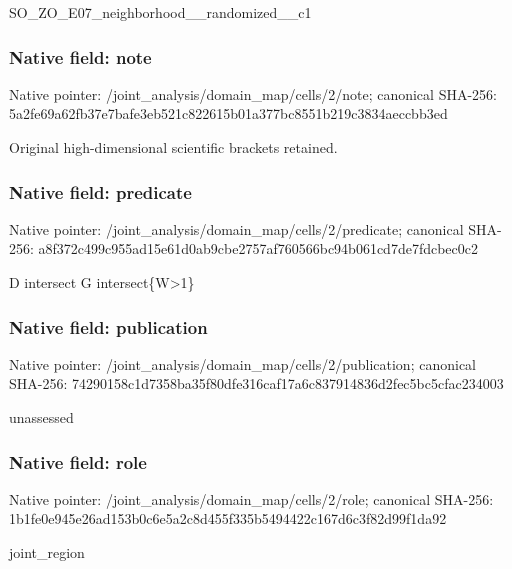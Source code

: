 \documentclass[10pt,a4paper]{article}
\begin{document}
\begingroup\raggedright\sloppy SO\_\allowbreak{}ZO\_\allowbreak{}E07\_\allowbreak{}neighborhood\_\allowbreak{}\_\allowbreak{}randomized\_\allowbreak{}\_\allowbreak{}c1\par\endgroup

\subsubsection{Native field: note}
Native pointer: /joint\_\allowbreak{}analysis/domain\_\allowbreak{}map/cells/2/note; canonical SHA-256: 5a2fe69a62fb37e7bafe3eb521c822615b01a377bc8551b219c3834aeccbb3ed

\begingroup\raggedright\sloppy Original high-dimensional scientific brackets retained.\par\endgroup

\subsubsection{Native field: predicate}
Native pointer: /joint\_\allowbreak{}analysis/domain\_\allowbreak{}map/cells/2/predicate; canonical SHA-256: a8f372c499c955ad15e61d0ab9cbe2757af760566bc94b061cd7de7fdcbec0c2

\begingroup\raggedright\sloppy D intersect G intersect\{W>1\}\par\endgroup

\subsubsection{Native field: publication}
Native pointer: /joint\_\allowbreak{}analysis/domain\_\allowbreak{}map/cells/2/publication; canonical SHA-256: 74290158c1d7358ba35f80dfe316caf17a6c837914836d2fec5bc5cfac234003

\begingroup\raggedright\sloppy unassessed\par\endgroup

\subsubsection{Native field: role}
Native pointer: /joint\_\allowbreak{}analysis/domain\_\allowbreak{}map/cells/2/role; canonical SHA-256: 1b1fe0e945e26ad153b0c6e5a2c8d455f335b5494422c167d6c3f82d99f1da92

\begingroup\raggedright\sloppy joint\_\allowbreak{}region\par\endgroup
\end{document}
